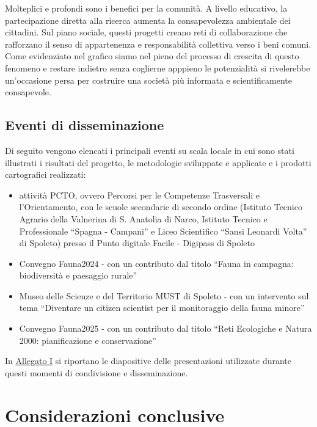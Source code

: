\documentclass[
]{book}
\providecommand{\tightlist}{%
  \setlength{\itemsep}{0pt}\setlength{\parskip}{0pt}}
\begin{document}
Molteplici e profondi sono i benefici per la comunità. A livello educativo, la partecipazione diretta alla ricerca aumenta la consapevolezza ambientale dei cittadini. Sul piano sociale, questi progetti creano reti di collaborazione che rafforzano il senso di appartenenza e responsabilità collettiva verso i beni comuni. Come evidenziato nel grafico siamo nel pieno del processo di crescita di questo fenomeno e restare indietro senza coglierne apppieno le potenzialità si rivelerebbe un'occasione persa per costruire una società più informata e scientificamente consapevole.

\section{Eventi di disseminazione}\label{eventi-di-disseminazione}

Di seguito vengono elencati i principali eventi su scala locale in cui sono stati illustrati i risultati del progetto, le metodologie sviluppate e applicate e i prodotti cartografici realizzati:

\begin{itemize}
\tightlist
\item
  attività PCTO, ovvero Percorsi per le Competenze Trasversali e l'Orientamento, con le scuole secondarie di secondo ordine (Istituto Tecnico Agrario della Valnerina di S. Anatolia di Narco, Istituto Tecnico e Professionale ``Spagna - Campani'' e Liceo Scientifico ``Sansi Leonardi Volta'' di Spoleto) presso il Punto digitale Facile - Digipass di Spoleto
\item
  Convegno Fauna2024 - con un contributo dal titolo ``Fauna in campagna: biodiversità e paesaggio rurale''
\item
  Museo delle Scienze e del Territorio MUST di Spoleto - con un intervento sul tema ``Diventare un citizen scientist per il monitoraggio della fauna minore''
\item
  Convegno Fauna2025 - con un contributo dal titolo ``Reti Ecologiche e Natura 2000: pianificazione e conservazione''
\end{itemize}

In \hyperref[annexI]{Allegato I} si riportano le diapositive delle presentazioni utilizzate durante questi momenti di condivisione e disseminazione.

\chapter{Considerazioni conclusive}\label{considerazioni-conclusive}
\end{document}
